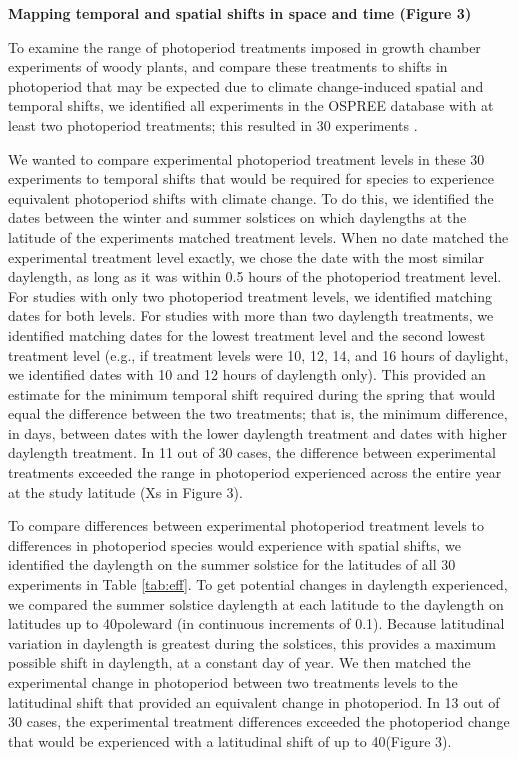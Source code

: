 \documentclass{article}
\begin{document}
\par \textbf{Mapping temporal and spatial shifts in space and time (Figure 3)}
\par To examine the range of photoperiod treatments imposed in growth chamber experiments of woody plants, and compare these treatments to shifts in photoperiod that may be expected due to climate change-induced spatial and temporal shifts, we identified all experiments in the OSPREE database with at least two photoperiod treatments; this resulted in 30 experiments \citep[Table \ref{tab:eff},][]{wolkovich2019}. 
\par We wanted to compare experimental photoperiod treatment levels in these 30 experiments to temporal shifts that would be required for species to experience equivalent photoperiod shifts with climate change. To do this, we identified the dates between the winter and summer solstices on which daylengths at the latitude of the experiments matched treatment levels. When no date matched the experimental treatment level exactly, we chose the date with the most similar daylength, as long as it was within 0.5 hours of the photoperiod treatment level. For studies with only two photoperiod treatment levels, we identified matching dates for both levels. For studies with more than two daylength treatments, we identified matching dates for the lowest treatment level and the second lowest treatment level (e.g., if treatment levels were 10, 12, 14, and 16 hours of daylight, we identified dates with 10 and 12 hours of daylength only). This provided an estimate for the minimum temporal shift required during the spring that would equal the difference between the two treatments; that is, the minimum difference, in days, between dates with the lower daylength treatment and dates with higher daylength treatment.
In 11 out of 30 cases, the difference between experimental treatments exceeded the range in photoperiod experienced across the entire year at the study latitude (Xs in Figure 3).

\par To compare differences between experimental photoperiod treatment levels to differences in photoperiod species would experience with spatial shifts, we identified the daylength on the summer solstice for the latitudes of all 30 experiments in Table \ref{tab:eff}. To get potential changes in daylength experienced, we compared the summer solstice daylength at each latitude to the daylength on latitudes up to 40\degree poleward (in continuous increments of 0.1\degree). Because latitudinal variation in daylength is greatest during the solstices, this provides a maximum possible shift in daylength, at a constant day of year. We then matched the experimental change in photoperiod between two treatments levels to the latitudinal shift that provided an equivalent change in photoperiod. In 13 out of 30 cases, the experimental treatment differences exceeded the photoperiod change that would be experienced with a latitudinal shift of up to 40\degree  (Figure 3). 
\end{document}
